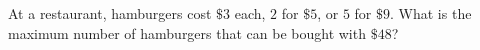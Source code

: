 At a restaurant, hamburgers cost $\$3$ each, $2$ for $\$5$, or $5$ for $\$9$. What is the maximum number of hamburgers that can be bought with $\$48$?
